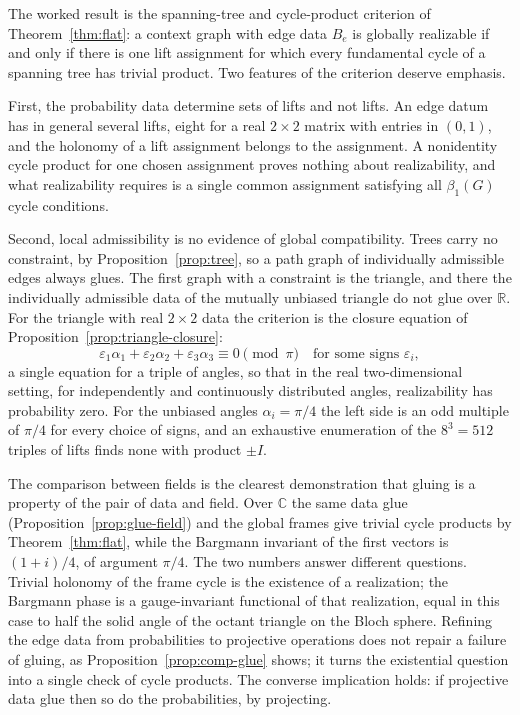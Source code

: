 \documentclass[11pt,oneside]{book}
\theoremstyle{definition}
\theoremstyle{remark}
\begin{document}
The worked result is the spanning-tree and cycle-product criterion of Theorem~\ref{thm:flat}: a context graph with edge data $B_e$ is globally realizable if and only if there is one lift assignment for which every fundamental cycle of a spanning tree has trivial product. Two features of the criterion deserve emphasis.

First, the probability data determine sets of lifts and not lifts. An edge datum has in general several lifts, eight for a real $2\times2$ matrix with entries in $(0,1)$, and the holonomy of a lift assignment belongs to the assignment. A nonidentity cycle product for one chosen assignment proves nothing about realizability, and what realizability requires is a single common assignment satisfying all $\beta_1(G)$ cycle conditions.

Second, local admissibility is no evidence of global compatibility. Trees carry no constraint, by Proposition~\ref{prop:tree}, so a path graph of individually admissible edges always glues. The first graph with a constraint is the triangle, and there the individually admissible data of the mutually unbiased triangle do not glue over $\mathbb R$. For the triangle with real $2\times2$ data the criterion is the closure equation of Proposition~\ref{prop:triangle-closure}:
\[
\varepsilon_1\alpha_1+\varepsilon_2\alpha_2+\varepsilon_3\alpha_3\equiv0\pmod\pi\quad\text{for some signs }\varepsilon_i,
\]
a single equation for a triple of angles, so that in the real two-dimensional setting, for independently and continuously distributed angles, realizability has probability zero. For the unbiased angles $\alpha_i=\pi/4$ the left side is an odd multiple of $\pi/4$ for every choice of signs, and an exhaustive enumeration of the $8^3=512$ triples of lifts finds none with product $\pm I$.

The comparison between fields is the clearest demonstration that gluing is a property of the pair of data and field. Over $\mathbb C$ the same data glue (Proposition~\ref{prop:glue-field}) and the global frames give trivial cycle products by Theorem~\ref{thm:flat}, while the Bargmann invariant of the first vectors is $(1+i)/4$, of argument $\pi/4$. The two numbers answer different questions. Trivial holonomy of the frame cycle is the existence of a realization; the Bargmann phase is a gauge-invariant functional of that realization, equal in this case to half the solid angle of the octant triangle on the Bloch sphere. Refining the edge data from probabilities to projective operations does not repair a failure of gluing, as Proposition~\ref{prop:comp-glue} shows; it turns the existential question into a single check of cycle products. The converse implication holds: if projective data glue then so do the probabilities, by projecting.
\end{document}
